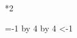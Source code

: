 \ifodd\value{page}\mbox{}\thispagestyle{empty}\newpage\fi

\begin{paracol}[1]*{2}


\end{paracol}

\clearpage
\newcount\padpages
\loop
  \padpages=\numexpr\value{page}-1\relax   %
  \divide\padpages by 4 \multiply\padpages by 4
\ifnum\padpages<\numexpr\value{page}-1\relax
  \mbox{}\thispagestyle{empty}\newpage
\repeat


